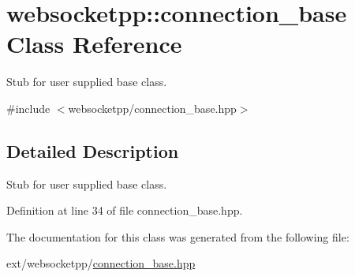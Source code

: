 \hypertarget{classwebsocketpp_1_1connection__base}{}\section{websocketpp\+:\+:connection\+\_\+base Class Reference}
\label{classwebsocketpp_1_1connection__base}


Stub for user supplied base class.  




{\ttfamily \#include $<$websocketpp/connection\+\_\+base.\+hpp$>$}



\subsection{Detailed Description}
Stub for user supplied base class. 

Definition at line 34 of file connection\+\_\+base.\+hpp.



The documentation for this class was generated from the following file\+:\begin{DoxyCompactItemize}
\item 
ext/websocketpp/\hyperlink{connection__base_8hpp}{connection\+\_\+base.\+hpp}\end{DoxyCompactItemize}
